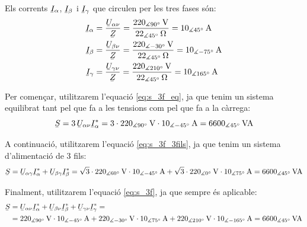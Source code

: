 \begin{exemple}
    Els corrents $\cmplx{I}_\alpha$, $\cmplx{I}_\beta$ i $\cmplx{I}_\gamma$ que
    circulen  per les tres fases s\'{o}n:
    \begin{align*}
        \cmplx{I}_\alpha &=\frac{\cmplx{U}_{\alpha\nu}}{\cmplx{Z}} =
        \frac{220_{\measuredangle 90\degree}\unit{V}}{22_{\measuredangle
    45\degree}\unit{\ohm}} =
        10_{\measuredangle 45\degree}\unit{A}\\
        \cmplx{I}_\beta &=\frac{\cmplx{U}_{\beta\nu}}{\cmplx{Z}} =
        \frac{220_{\measuredangle -30\degree}\unit{V}}{22_{\measuredangle
    45\degree}\unit{\ohm}} =
        10_{\measuredangle -75\degree}\unit{A}\\
        \cmplx{I}_\gamma &=\frac{\cmplx{U}_{\gamma\nu}}{\cmplx{Z}} =
        \frac{220_{\measuredangle 210\degree}\unit{V}}{22_{\measuredangle
    45\degree}\unit{\ohm} } =
        10_{\measuredangle 165\degree}\unit{A}
    \end{align*}


    Per comen\c{c}ar,  utilitzarem l'equaci\'{o} \eqref{eq:s_3f_eq}, ja que tenim
    un sistema equilibrat tant pel que fa a les tensions com pel que fa a la c\`{a}rrega:
    \[
    \cmplx{S} = 3\,\cmplx{U}_{\alpha\nu} \cmplx{I}_\alpha^* =
    3\cdot 220_{\measuredangle 90\degree}\unit{V} \cdot
    10_{\measuredangle -45\degree}\unit{A} = 6600_{\measuredangle 45\degree}\unit{VA}
    \]

    A continuaci\'{o},  utilitzarem l'equaci\'{o} \eqref{eq:s_3f_3fils}, ja que tenim
    un sistema d'alimentaci\'{o} de 3 fils:
    \[
    \cmplx{S} = \cmplx{U}_{\alpha\gamma} \cmplx{I}_\alpha^*
     +  \cmplx{U}_{\beta\gamma} \cmplx{I}_\beta^* =
    \sqrt{3}\cdot220_{\measuredangle 60\degree}\unit{V} \cdot
    10_{\measuredangle -45\degree}\unit{A} + \sqrt{3}\cdot220_{\measuredangle 0\degree}\unit{V}
    \cdot 10_{\measuredangle 75\degree}\unit{A}  = 6600_{\measuredangle 45\degree}\unit{VA}
    \]

     Finalment,  utilitzarem l'equaci\'{o} \eqref{eq:s_3f}, ja que
     sempre \'{e}s aplicable:
     \[\begin{split}
     \cmplx{S} &=  \cmplx{U}_{\alpha\nu} \cmplx{I}_\alpha^* +
     \cmplx{U}_{\beta\nu} \cmplx{I}_\beta^* +  \cmplx{U}_{\gamma\nu}
     \cmplx{I}_\gamma^* =\\
     &= 220_{\measuredangle 90\degree}\unit{V}
     \cdot 10_{\measuredangle -45\degree}\unit{A} + 220_{\measuredangle
     -30\degree}\unit{V} \cdot 10_{\measuredangle 75\degree}\unit{A}
     + 220_{\measuredangle 210\degree}\unit{V} \cdot 10_{\measuredangle
     -165\degree}\unit{A} =6600_{\measuredangle 45\degree}\unit{VA}
     \end{split} \]


\end{exemple}
